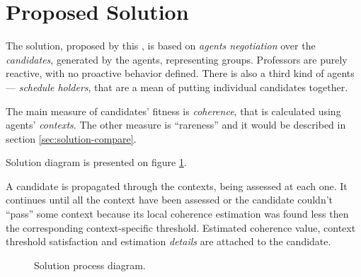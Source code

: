 \documentclass[ThesisDoc]{subfiles}
\providecommand{\rootdir}{.}
\begin{document}
\section{Proposed Solution}
\label{sec:solution}


The solution, proposed by this \thisdoc, is based on \emph{agents negotiation}
over the \emph{candidates}, generated by the agents, representing groups.
Professors are purely reactive, with no proactive behavior defined.
There is also a third kind of agents --- \emph{schedule holders}, that are
a mean of putting individual candidates together.

The main measure of candidates' fitness is \emph{coherence}, that is calculated
using agents' \emph{contexts}. The other measure is ``rareness'' and it would be
described in section \ref{sec:solution-compare}.

Solution diagram is presented on figure \ref{fig:solution-flow}.






\medskip{}\medskip

\noindent
A candidate is propagated through the contexts, being assessed at each one.
It continues until all the context have been assessed or the candidate couldn't
``pass'' some context because its local coherence estimation was found less then
the corresponding context-specific threshold. Estimated coherence value,
context threshold satisfaction and estimation \emph{details}
are attached to the candidate.








\begin{figure}[H]
    \centering
    \resizebox{1.2\textwidth}{!}{
      
      }
  \caption{Solution process diagram.}
  \label{fig:solution-flow}
\end{figure}
\end{document}
